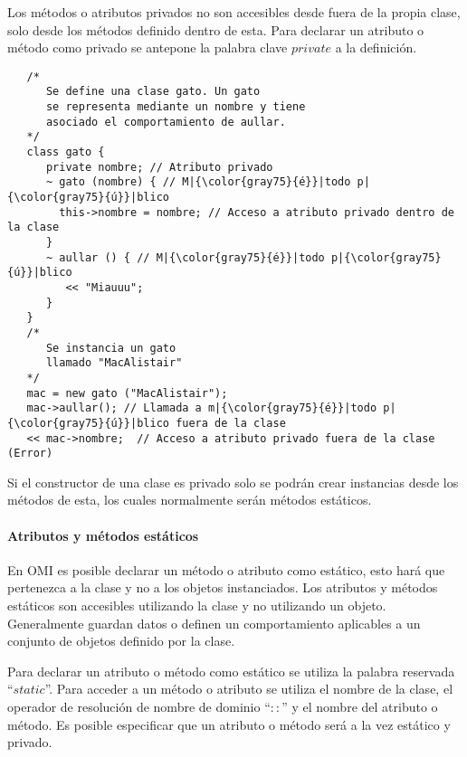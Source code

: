 Los métodos o atributos privados no son accesibles desde fuera de la propia clase, solo desde los métodos definido dentro de esta. Para 
declarar un atributo o método como privado se antepone la palabra clave $private$ a la definición. \\

\begin{lstlisting}
   /*
      Se define una clase gato. Un gato 
      se representa mediante un nombre y tiene
      asociado el comportamiento de aullar.
   */
   class gato {
      private nombre; // Atributo privado
      ~ gato (nombre) { // M|{\color{gray75}{é}}|todo p|{\color{gray75}{ú}}|blico
        this->nombre = nombre; // Acceso a atributo privado dentro de la clase
      }
      ~ aullar () { // M|{\color{gray75}{é}}|todo p|{\color{gray75}{ú}}|blico
         << "Miauuu";
      }
   }
   /*
      Se instancia un gato 
      llamado "MacAlistair"
   */
   mac = new gato ("MacAlistair"); 
   mac->aullar(); // Llamada a m|{\color{gray75}{é}}|todo p|{\color{gray75}{ú}}|blico fuera de la clase
   << mac->nombre;  // Acceso a atributo privado fuera de la clase (Error)
\end{lstlisting}

Si el constructor de una clase es privado solo se podrán crear instancias desde los métodos de esta, los cuales normalmente serán métodos estáticos. 

\paragraph{Atributos y métodos estáticos}

En OMI es posible declarar un método o atributo como estático, esto hará que pertenezca a la clase y no a los objetos instanciados. 
Los atributos y métodos estáticos son accesibles utilizando la clase y no utilizando un objeto. Generalmente guardan datos o definen un 
comportamiento aplicables a un conjunto de objetos definido por la clase. 

Para declarar un atributo o método como estático se utiliza la palabra reservada ``$static$''. Para acceder a un método o atributo se utiliza el
nombre de la clase, el operador de resolución de nombre de dominio ``$::$'' y el nombre del atributo o método. Es posible especificar que 
un atributo o método será a la vez estático y privado. \\

